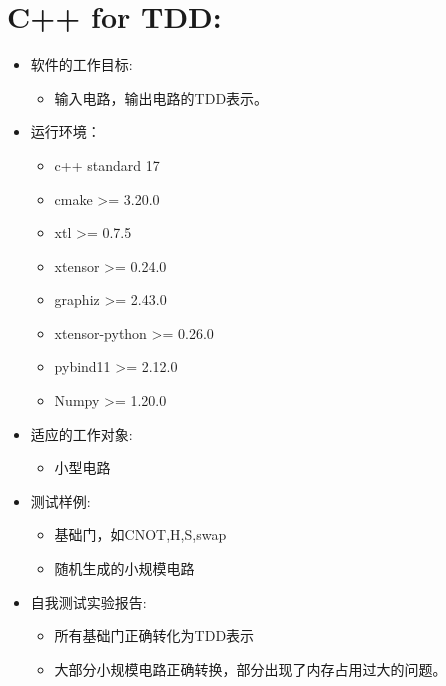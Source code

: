 \documentclass{article}
\begin{document}
\section{C++ for TDD:}
\begin{itemize}
    \item {软件的工作目标:} 
    \begin{itemize}
        \item 输入电路，输出电路的TDD表示。
    \end{itemize}
    \item {运行环境：} 
    \begin{itemize}
        \item c++ standard 17
        \item cmake >= 3.20.0
        \item xtl >= 0.7.5
        \item xtensor >= 0.24.0
        \item graphiz >= 2.43.0
        \item xtensor-python >= 0.26.0
        \item pybind11 >= 2.12.0
        \item Numpy >= 1.20.0
    \end{itemize} 
    \item {适应的工作对象:}
    \begin{itemize}
        \item 小型电路
    \end{itemize}
    \item {测试样例:}
    \begin{itemize}
        \item 基础门，如CNOT,H,S,swap
        \item 随机生成的小规模电路
    \end{itemize}
    \item {自我测试实验报告:}
    \begin{itemize}
        \item 所有基础门正确转化为TDD表示
        \item 大部分小规模电路正确转换，部分出现了内存占用过大的问题。
    \end{itemize}
\end{itemize}
\end{document}

